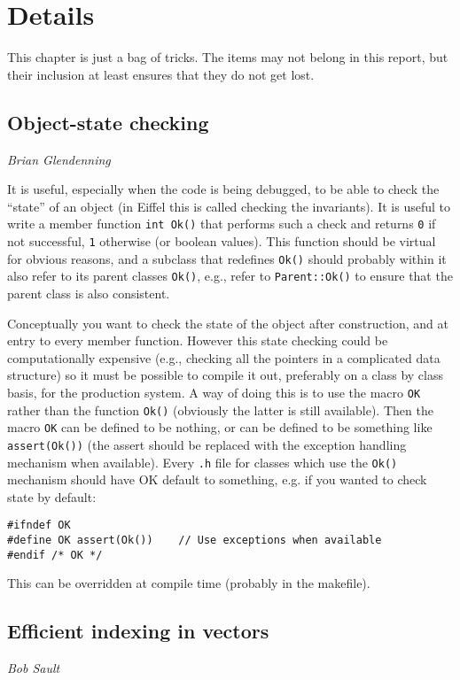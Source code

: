 \chapter{Details}
This chapter is just a bag of tricks. The items may not belong in this report,
but their inclusion at least ensures that they do not get lost.

\section{Object-state checking}
{\it Brian Glendenning}

It is useful, especially when the code is being debugged, to be able
to check the ``state'' of an object (in Eiffel this is called checking
the invariants). It is useful to write a member function {\tt int Ok()} that
performs such a check and returns {\tt 0} if not successful, {\tt 1} otherwise
(or boolean values). This function should be virtual for obvious reasons,
and a subclass that redefines {\tt Ok()} should probably within it also
refer to its parent classes {\tt Ok()}, e.g., refer to {\tt Parent::Ok()} to
ensure that the parent class is also consistent.

Conceptually you want to check the state of the object after
construction, and at entry to every member function. However this
state checking could be computationally expensive (e.g., checking all
the pointers in a complicated data structure) so it must be possible
to compile it out, preferably on a class by class basis, for the
production system. A way of doing this is to use the macro {\tt OK} rather
than the function {\tt Ok()} (obviously the latter is still available). Then
the macro {\tt OK} can be defined to be nothing, or can be defined to be
something like {\tt assert(Ok())} (the assert should be replaced with the
exception handling mechanism when available). Every {\tt .h} file for
classes which use the {\tt Ok()} mechanism should have OK default to
something, e.g. if you wanted to check state by default:

\begin{verbatim}
#ifndef OK
#define OK assert(Ok())    // Use exceptions when available
#endif /* OK */
\end{verbatim}

This can be overridden at compile time (probably in the makefile).


\section{Efficient indexing in vectors}
{\it Bob Sault}

